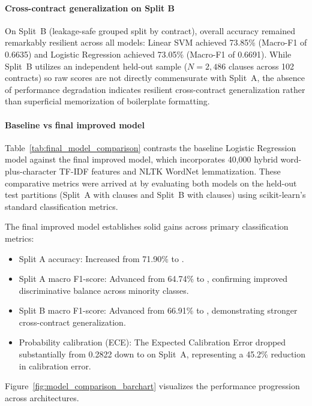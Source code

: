 \paragraph*{Cross-contract generalization on Split B}
On Split~B (leakage-safe grouped split by contract), overall accuracy remained remarkably resilient across all models: Linear SVM achieved 73.85\% (Macro-F1 of 0.6635) and Logistic Regression achieved 73.05\% (Macro-F1 of 0.6691). While Split~B utilizes an independent held-out sample ($N = 2,486$ clauses across 102 contracts) so raw scores are not directly commensurate with Split~A, the absence of performance degradation indicates resilient cross-contract generalization rather than superficial memorization of boilerplate formatting.

\paragraph*{Baseline vs final improved model}
Table~\ref{tab:final_model_comparison} contrasts the baseline Logistic Regression model against the final improved model, which incorporates 40,000 hybrid word-plus-character TF-IDF features and NLTK WordNet lemmatization. These comparative metrics were arrived at by evaluating both models on the held-out test partitions (Split~A with \SplitATestClauses{} clauses and Split~B with \SplitBTestClauses{} clauses) using scikit-learn's standard classification metrics.



The final improved model establishes solid gains across primary classification metrics:
\begin{itemize}
    \item Split A accuracy: Increased from 71.90\% to \FinalSplitAAcc{}.
    \item Split A macro F1-score: Advanced from 64.74\% to \FinalSplitAMacroFScore{}, confirming improved discriminative balance across minority classes.
    \item Split B macro F1-score: Advanced from 66.91\% to \FinalSplitBMacroFScore{}, demonstrating stronger cross-contract generalization.
    \item Probability calibration (ECE): The Expected Calibration Error dropped substantially from 0.2822 down to \FinalSplitAECE{} on Split~A, representing a 45.2\% reduction in calibration error.
\end{itemize}

Figure~\ref{fig:model_comparison_barchart} visualizes the performance progression across architectures.

